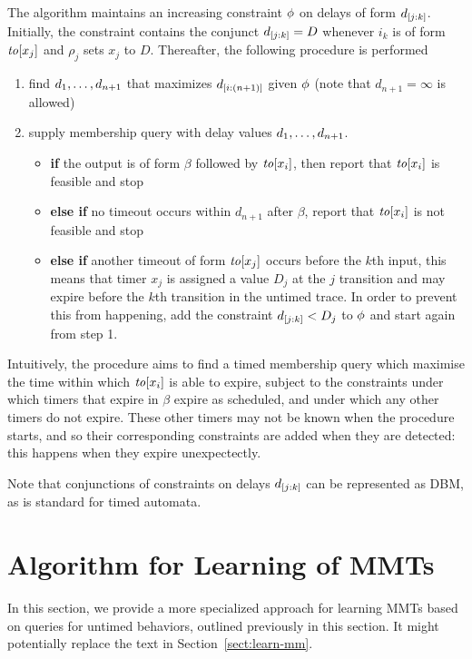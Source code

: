 The algorithm maintains an increasing constraint $\phi$ on delays of form
$d_{[j:k]}$. Initially, the constraint contains the conjunct
$d_{[j:k]} = D$ whenever $i_k$ is of form $\mathit{to}[x_j]$ and
$\rho_j$ sets $x_j$ to $D$.
Thereafter, the following procedure is performed
  \begin{enumerate}
  \item
    find ${d}_1 , \ldots , {d}_{{n+1}}$ that maximizes $d_{[i:(n+1)]}$ given
    $\phi$ (note that $d_{n+1} = \infty$ is allowed)
  \item
    supply membership query with delay values ${d}_1 , \ldots , {d}_{{n+1}}$.
\begin{itemize}
  \item
    {\bf if} the output is of form $\beta$ followed by $\mathit{to}[x_i]$, then
    report that $\mathit{to}[x_i]$ is feasible and stop
  \item
    {\bf else if} no timeout occurs within $d_{n+1}$ after $\beta$, report
    that $\mathit{to}[x_i]$ is not feasible and stop
  \item
    {\bf else if} another timeout of form $\mathit{to}[x_j]$ occurs before
    the $k$th input, this means that timer $x_j$ is assigned a value
    $D_j$ at the $j$ transition and may expire before the $k$th transition
    in the untimed trace. In order to prevent this from happening,
    add the constraint $d_{[j:k]} < D_j$ to $\phi$ and start again
    from step 1.
\end{itemize}
  \end{enumerate}
  Intuitively, the procedure aims to find a timed membership query which maximise
  the time within which $\mathit{to}[x_i]$ is able to expire,
  subject to the constraints under which timers that expire in $\beta$ expire
  as scheduled, and under which any other timers do not expire. These
  other timers may not be known when the procedure starts, and so their
  corresponding constraints are added when they are detected: this happens
  when they expire unexpectectly.

  Note that conjunctions of constraints on delays $d_{[j:k]}$ can be represented as DBM, as is standard for timed automata.

\section{Algorithm for Learning of MMTs}

In this section, we provide a more specialized approach for learning MMTs based
on queries for untimed behaviors, outlined previously in this section.
It might potentially replace the text in Section~\ref{sect:learn-mm}.

